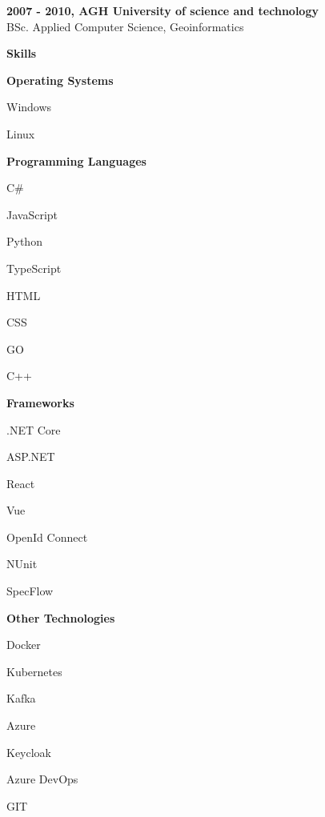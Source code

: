 \documentclass[a4paper,12pt,final]{memoir}
\newcommand{\Sep}{\vspace{1.5em}}
\newcommand{\SmallSep}{\vspace{0.5em}}
\newcommand{\CVSection}[1]
	{\Large\textbf{#1}\par
	\SmallSep\normalsize\normalfont}
\newcommand{\CVItem}[1]
	{\textbf{\color{RoyalBlue} #1}}
\begin{document}
\CVItem{2007 - 2010, AGH University of science and technology}\\
BSc. Applied Computer Science, Geoinformatics
\SmallSep

\CVSection{Skills}
\CVItem{Operating Systems}
\begin{multicols}{3}
\begin{compactitem}[\color{RoyalBlue}$\circ$]
	\item Windows 
	\item Linux
\end{compactitem}
\end{multicols}
\SmallSep

\CVItem{Programming Languages}
\begin{multicols}{3}
\begin{compactitem}[\color{RoyalBlue}$\circ$]
	\item C\# 
	\item JavaScript 
	\item Python
	\item TypeScript
	\item HTML
	\item CSS
	\item GO
	\item C++
\end{compactitem}
\end{multicols}
\SmallSep

\CVItem{Frameworks}
\begin{multicols}{3}
\begin{compactitem}[\color{RoyalBlue}$\circ$]
	\item .NET Core
	\item ASP.NET
	\item React
	\item Vue
	\item OpenId Connect
	\item NUnit
	\item SpecFlow
\end{compactitem}
\end{multicols}
\SmallSep

\CVItem{Other Technologies}
\begin{multicols}{3}
\begin{compactitem}[\color{RoyalBlue}$\circ$]
	\item Docker
	\item Kubernetes
	\item Kafka
	\item Azure
	\item Keycloak
	\item Azure DevOps
	\item GIT
\end{compactitem}
\end{multicols}
\Sep 

\end{document}
